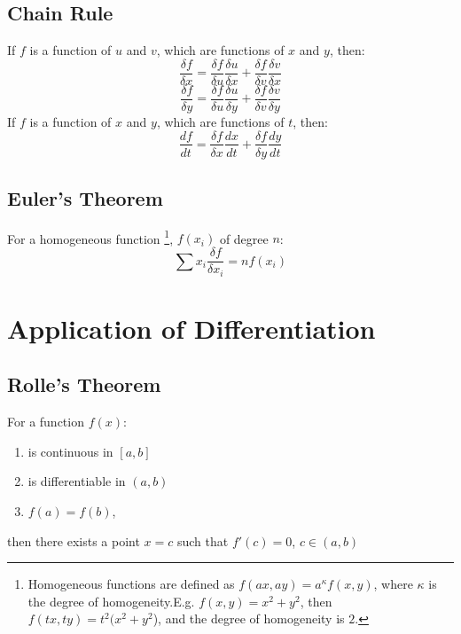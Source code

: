 \documentclass[openany, oneside]{book}
\begin{document}
\section{Chain Rule}
If $f$ is a function of $u$ and $v$, which are functions of $x$ and $y$, then:
\begin{equation}
\dfrac{\delta f}{\delta x}=\dfrac{\delta f}{\delta u}\dfrac{\delta u}{\delta x}+\dfrac{\delta f}{\delta v}\dfrac{\delta v}{\delta x}
\end{equation}
\begin{equation}
\dfrac{\delta f}{\delta y}=\dfrac{\delta f}{\delta u}\dfrac{\delta u}{\delta y}+\dfrac{\delta f}{\delta v}\dfrac{\delta v}{\delta y}
\end{equation}
If $f$ is a function of $x$ and $y$, which are functions of $t$, then:
\begin{equation}
\dfrac{df}{dt}=\dfrac{\delta f}{\delta x}\dfrac{dx}{dt}+\dfrac{\delta f}{\delta y}\dfrac{dy}{dt}
\end{equation}

\section{Euler's Theorem}
For a homogeneous function \footnote{Homogeneous functions are defined as $f(ax,ay)=a^\kappa f(x,y)$, where $\kappa$ is the degree of homogeneity.\newline E.g. $f(x,y)=x^2+y^2$, then $f(tx,ty)=t^2(x^2+y^2$), and the degree of homogeneity is $2$.}, $f(x_i)$ of degree $n$:
\begin{equation}
\sum x_i\dfrac{\delta f}{\delta x_i}=nf(x_i)
\end{equation}

\large{\chapter{Application of Differentiation}}
\section{Rolle's Theorem}
For a function $f(x)$:
\begin{enumerate}
\item is continuous in $[a,b]$
\item is differentiable in $(a,b)$
\item $f(a)=f(b)$,
\end{enumerate}
then there exists a point $x=c$ such that $f'(c)=0$, $c\in(a,b)$
\end{document}
